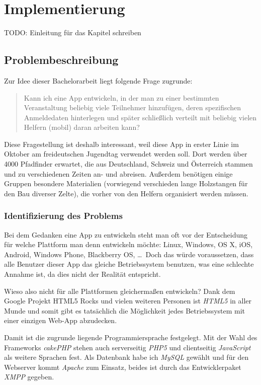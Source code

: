 \chapter{Implementierung}
TODO: Einleitung für das Kapitel schreiben

\section{Problembeschreibung}
Zur Idee dieser Bachelorarbeit liegt folgende Frage zugrunde:
\begin{quote}
	Kann ich eine App entwickeln, in der man zu einer bestimmten Veranstaltung beliebig viele Teilnehmer hinzufügen, deren spezifischen Anmeldedaten hinterlegen und später schließlich verteilt mit beliebig vielen Helfern (mobil) daran arbeiten kann? 
\end{quote}
Diese Fragestellung ist deshalb interessant, weil diese App in erster Linie im Oktober am freideutschen Jugendtag verwendet werden soll. Dort werden über 4000 Pfadfinder erwartet, die aus Deutschland, Schweiz und Österreich stammen und zu verschiedenen Zeiten an- und abreisen. Außerdem benötigen einige Gruppen besondere Materialien (vorwiegend verschieden lange Holzstangen für den Bau diverser Zelte), die vorher von den Helfern organisiert werden müssen.\par

\subsection{Identifizierung des Problems}
Bei dem Gedanken eine App zu entwickeln steht man oft vor der Entscheidung für welche Plattform man denn entwickeln möchte: Linux, Windows, OS X, iOS, Android, Windows Phone, Blackberry OS, \dots \ Doch das würde voraussetzen, dass alle Benutzer dieser App das gleiche Betriebssystem benutzen, was eine schlechte Annahme ist, da dies nicht der Realität entspricht.\par

Wieso also nicht für alle Plattformen gleichermaßen entwickeln? Dank dem Google Projekt \glqq HTML5 Rocks\grqq{}\cite{html5rocksmain} und vielen weiteren Personen ist \emph{HTML5} in aller Munde und somit gibt es tatsächlich die Möglichkeit jedes Betriebssystem mit einer einzigen Web-App abzudecken.\par

Damit ist die zugrunde liegende Programmiersprache festgelegt. Mit der Wahl des Frameworks \emph{cakePHP} stehen auch serverseitig \emph{PHP5} und clientseitig \emph{JavaScript} als weitere Sprachen fest. Als Datenbank habe ich \emph{MySQL} gewählt und für den Webserver kommt \emph{Apache} zum Einsatz, beides ist durch das Entwicklerpaket \emph{XMPP} gegeben.

